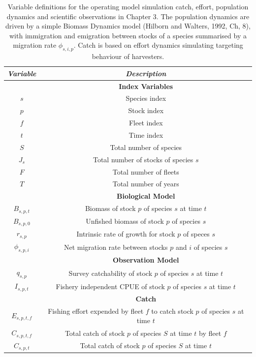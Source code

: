 \documentclass[]{scrartcl}
\begin{document}
\begin{table}[htbp]
\begin{center}
\caption{Variable definitions for the operating model simulation catch, effort, population dynamics and scientific observations in Chapter 3. The population dynamics are driven by a simple Biomass Dynamics model (Hilborn and Walters, 1992, Ch, 8), with immigration and emigration between stocks of a species summarised by a migration rate $\phi_{s,i,p}$. Catch is based on effort dynamics simulating targeting behaviour of harvesters.}\label{tab:OMspec}
\begin{tabular}{c|c}
\textit{Variable} & \textit{Description}  \\
\hline
& \textbf{ Index Variables} \\
\hline
$s$ & Species index \\
$p$ & Stock index \\
$f$ & Fleet index \\
$t$ & Time index \\
$S$ & Total number of species \\
$J_s$ & Total number of stocks of species $s$ \\
$F$ & Total number of fleets \\
$T$ & Total number of years \\
\hline
& \textbf{ Biological Model} \\
\hline
$B_{s,p,t}$ & Biomass of stock $p$ of species $s$ at time $t$ \\
$B_{s,p,0}$ & Unfished biomass of stock $p$ of species $s$ \\
$r_{s,p}$ & Intrinsic rate of growth for stock $p$ of speces $s$ \\
$\phi_{s,p,i}$ &  Net migration rate between stocks $p$ and $i$ of species $s$ \\
\hline
& \textbf{ Observation Model} \\
\hline
$q_{s,p}$ & Survey catchability of stock $p$ of species $s$ at time $t$ \\
$I_{s,p,t}$ & Fishery independent CPUE of stock $p$ of species $s$ at time $t$ \\
\hline
& \textbf{ Catch} \\
\hline
$E_{s,p,t,f}$ & Fishing effort expended by fleet $f$ to catch stock $p$ of species $s$ at time $t$ \\
$C_{s,p,t,f}$ & Total catch of stock $p$ of species $S$ at time $t$ by fleet $f$ \\
$C_{s,p,t}$ & Total catch of stock $p$ of species $S$ at time $t$ \\

\end{tabular}
\end{center}
\end{table}
\end{document}
